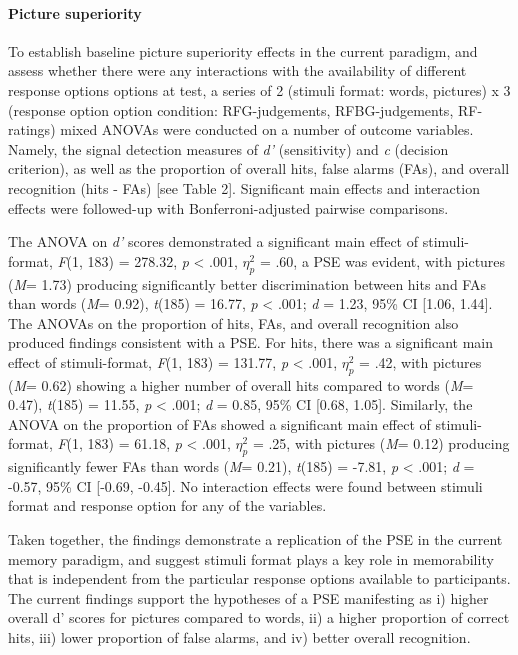 \documentclass[
  11pt,
]{article}
\begin{document}
\hypertarget{picture-superiority}{%
\paragraph{Picture superiority}\label{picture-superiority}}

To establish baseline picture superiority effects in the current
paradigm, and assess whether there were any interactions with the
availability of different response options options at test, a series of
2 (stimuli format: words, pictures) x 3 (response option option
condition: RFG-judgements, RFBG-judgements, RF-ratings) mixed ANOVAs
were conducted on a number of outcome variables. Namely, the signal
detection measures of \emph{d'} (sensitivity) and \emph{c} (decision
criterion), as well as the proportion of overall hits, false alarms
(FAs), and overall recognition (hits - FAs) {[}see Table 2{]}.
Significant main effects and interaction effects were followed-up with
Bonferroni-adjusted pairwise comparisons.

The ANOVA on \emph{d'} scores demonstrated a significant main effect of
stimuli-format, \emph{F}(1, 183) = 278.32, \emph{p} \textless{} .001,
\(\eta^2_p\) = .60, a PSE was evident, with pictures (\emph{M}= 1.73)
producing significantly better discrimination between hits and FAs than
words (\emph{M}= 0.92), \emph{t}(185) = 16.77, \emph{p} \textless{}
.001; \emph{d} = 1.23, 95\% CI {[}1.06, 1.44{]}. The ANOVAs on the
proportion of hits, FAs, and overall recognition also produced findings
consistent with a PSE. For hits, there was a significant main effect of
stimuli-format, \emph{F}(1, 183) = 131.77, \emph{p} \textless{} .001,
\(\eta^2_p\) = .42, with pictures (\emph{M}= 0.62) showing a higher
number of overall hits compared to words (\emph{M}= 0.47), \emph{t}(185)
= 11.55, \emph{p} \textless{} .001; \emph{d} = 0.85, 95\% CI {[}0.68,
1.05{]}. Similarly, the ANOVA on the proportion of FAs showed a
significant main effect of stimuli-format, \emph{F}(1, 183) = 61.18,
\emph{p} \textless{} .001, \(\eta^2_p\) = .25, with pictures (\emph{M}=
0.12) producing significantly fewer FAs than words (\emph{M}= 0.21),
\emph{t}(185) = -7.81, \emph{p} \textless{} .001; \emph{d} = -0.57, 95\%
CI {[}-0.69, -0.45{]}. No interaction effects were found between stimuli
format and response option for any of the variables.

Taken together, the findings demonstrate a replication of the PSE in the
current memory paradigm, and suggest stimuli format plays a key role in
memorability that is independent from the particular response options
available to participants. The current findings support the hypotheses
of a PSE manifesting as i) higher overall d' scores for pictures
compared to words, ii) a higher proportion of correct hits, iii) lower
proportion of false alarms, and iv) better overall recognition.
\end{document}
